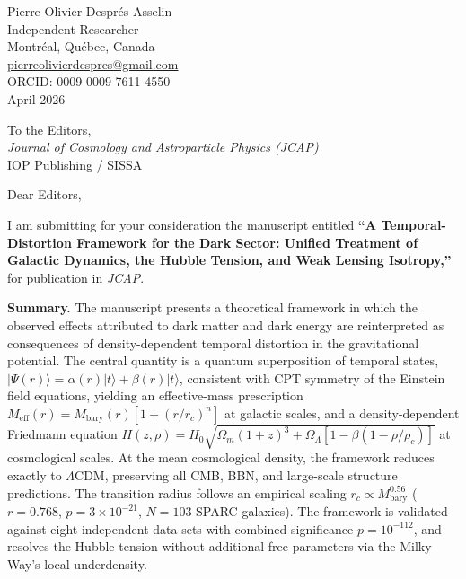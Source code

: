 \documentclass[12pt]{article}
\begin{document}
\begin{flushright}
  Pierre-Olivier Despr\'{e}s Asselin \\
  Independent Researcher \\
  Montr\'{e}al, Qu\'{e}bec, Canada \\
  \href{mailto:pierreolivierdespres@gmail.com}{pierreolivierdespres@gmail.com} \\
  ORCID: 0009-0009-7611-4550 \\[6pt]
  April 2026
\end{flushright}

\bigskip

\noindent
To the Editors, \\
\textit{Journal of Cosmology and Astroparticle Physics (JCAP)} \\
IOP Publishing / SISSA

\bigskip

Dear Editors,

I am submitting for your consideration the manuscript entitled
\textbf{``A Temporal-Distortion Framework for the Dark Sector:
Unified Treatment of Galactic Dynamics, the Hubble Tension, and Weak
Lensing Isotropy,''} for publication in \textit{JCAP}.

\bigskip

\textbf{Summary.}
The manuscript presents a theoretical framework in which the observed
effects attributed to dark matter and dark energy are reinterpreted as
consequences of density-dependent temporal distortion in the
gravitational potential. The central quantity is a quantum
superposition of temporal states,
$|\Psi(r)\rangle = \alpha(r)|t\rangle + \beta(r)|\bar t\rangle$,
consistent with CPT symmetry of the Einstein field equations, yielding
an effective-mass prescription
$M_\mathrm{eff}(r) = M_\mathrm{bary}(r)[1 + (r/r_c)^n]$ at galactic
scales, and a density-dependent Friedmann equation
$H(z,\rho) = H_0\sqrt{\Omega_m(1+z)^3 + \Omega_\Lambda[1-\beta(1-\rho/\rho_c)]}$
at cosmological scales. At the mean cosmological density, the
framework reduces exactly to $\Lambda$CDM, preserving all CMB, BBN, and
large-scale structure predictions. The transition radius follows an
empirical scaling $r_c \propto M_\mathrm{bary}^{0.56}$
($r = 0.768$, $p = 3\times10^{-21}$, $N = 103$ SPARC galaxies).
The framework is validated against eight independent data sets with
combined significance $p = 10^{-112}$, and resolves the Hubble tension
without additional free parameters via the Milky Way's local
underdensity.

\bigskip
\end{document}
